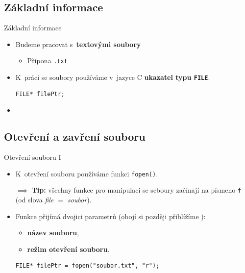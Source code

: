 \documentclass[14pt,aspectratio=169]{beamer}
\begin{document}
    \subsection{Základní informace}
    \begin{frame}[t,fragile]{Základní informace}
        \begin{itemize}
            \item Budeme pracovat s~\textbf{textovými soubory}
            \begin{itemize}
                \item Přípona \texttt{.txt}
            \end{itemize}
            \item K~práci se soubory používáme v~jazyce C \textbf{ukazatel typu \texttt{FILE}}.
            \begin{lstlisting}
FILE* filePtr;
            \end{lstlisting}
            \item {}
        \end{itemize}
    \end{frame}

    \subsection{Otevření a zavření souboru}
    \begin{frame}[t,fragile]{Otevření souboru \textrm{I}}
        \begin{itemize}
            \item K~otevření souboru používáme funkci \texttt{fopen()}.
            \begin{center}
                $\implies$ \textbf{Tip:} všechny funkce pro manipulaci se seboury začínají na písmeno \texttt{f} (od slova \emph{file $=$ soubor}).
            \end{center}
            \item Funkce přijímá dvojici parametrů (obojí si později přiblížíme ):
            \begin{itemize}
                \item \textbf{název souboru},
                \item \textbf{režim otevření souboru}.
            \end{itemize}
            \begin{lstlisting}
FILE* filePtr = fopen("soubor.txt", "r");
            \end{lstlisting}
        \end{itemize}
    \end{frame}
\end{document}
